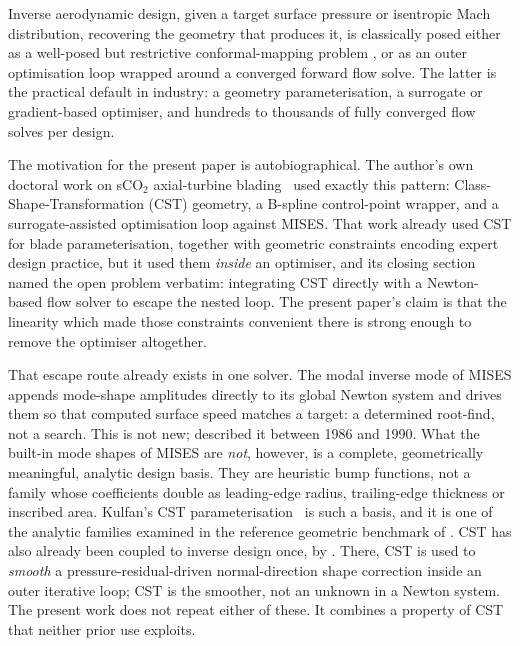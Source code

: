 Inverse aerodynamic design, given a target surface pressure or isentropic
Mach distribution, recovering the geometry that produces it, is classically
posed either as a well-posed but restrictive conformal-mapping problem
\citep{lighthill1945new,volpe1986design}, or as an outer optimisation loop
wrapped around a converged forward flow solve. The latter is the practical
default in industry: a geometry parameterisation, a surrogate or
gradient-based optimiser, and hundreds to thousands of fully converged flow
solves per design.

The motivation for the present paper is autobiographical. The author's own
doctoral work on sCO$_2$ axial-turbine blading~\citep{sathish2019sco2} used
exactly this pattern: Class-Shape-Transformation (CST) geometry, a B-spline
control-point wrapper, and a surrogate-assisted optimisation loop against
MISES. That work already used CST for blade parameterisation, together with
geometric constraints encoding expert design practice, but it used them
\emph{inside} an optimiser, and its closing section named the open problem
verbatim: integrating CST directly with a Newton-based flow solver to escape
the nested loop. The present paper's claim is that the linearity which made
those constraints convenient there is strong enough to remove the optimiser
altogether.

That escape route already exists in one solver. The modal inverse mode of
MISES \citep{drela1990viscous} appends mode-shape amplitudes directly to its
global Newton system and drives them so that computed surface speed matches a
target: a determined root-find, not a search. This is not new;
\citet{drela1990viscous} described it between 1986 and 1990. What the
built-in mode shapes of MISES are \emph{not}, however, is a complete,
geometrically meaningful, analytic design basis. They are heuristic bump
functions, not a family whose coefficients double as leading-edge radius,
trailing-edge thickness or inscribed area. Kulfan's CST
parameterisation~\citep{kulfan2008universal} is such a basis, and it is one
of the analytic families examined in the reference geometric benchmark of
\citet{masters2017geometric}. CST has also already been coupled to inverse
design once, by \citet{lane2010inverse}. There, CST is used to \emph{smooth} a
pressure-residual-driven normal-direction shape correction inside an outer
iterative loop; CST is the smoother, not an unknown in a Newton system. The
present work does not repeat either of these. It combines a property of CST
that neither prior use exploits.

